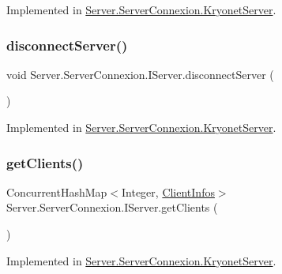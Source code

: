 Implemented in \mbox{\hyperlink{classServer_1_1ServerConnexion_1_1KryonetServer_ac594217673743346d963fa9e04f7a9dc}{Server.\+Server\+Connexion.\+Kryonet\+Server}}.

\mbox{\label{interfaceServer_1_1ServerConnexion_1_1IServer_abad216cef2fde213cfe1e69f2be7b496}} 
\subsubsection{\texorpdfstring{disconnect\+Server()}{disconnectServer()}}
{\footnotesize\ttfamily void Server.\+Server\+Connexion.\+I\+Server.\+disconnect\+Server (\begin{DoxyParamCaption}{ }\end{DoxyParamCaption})}



Implemented in \mbox{\hyperlink{classServer_1_1ServerConnexion_1_1KryonetServer_a9ee03f7e9a0b2d685f4e70af32a8204e}{Server.\+Server\+Connexion.\+Kryonet\+Server}}.

\mbox{\label{interfaceServer_1_1ServerConnexion_1_1IServer_a0b71f139e86b01657d54b4be165d0c8d}} 
\subsubsection{\texorpdfstring{get\+Clients()}{getClients()}}
{\footnotesize\ttfamily Concurrent\+Hash\+Map$<$Integer, \mbox{\hyperlink{classServer_1_1ServerConnexion_1_1ClientInfos}{Client\+Infos}}$>$ Server.\+Server\+Connexion.\+I\+Server.\+get\+Clients (\begin{DoxyParamCaption}{ }\end{DoxyParamCaption})}



Implemented in \mbox{\hyperlink{classServer_1_1ServerConnexion_1_1KryonetServer_a49d513edab305edc72d56d173dd44ad3}{Server.\+Server\+Connexion.\+Kryonet\+Server}}.

